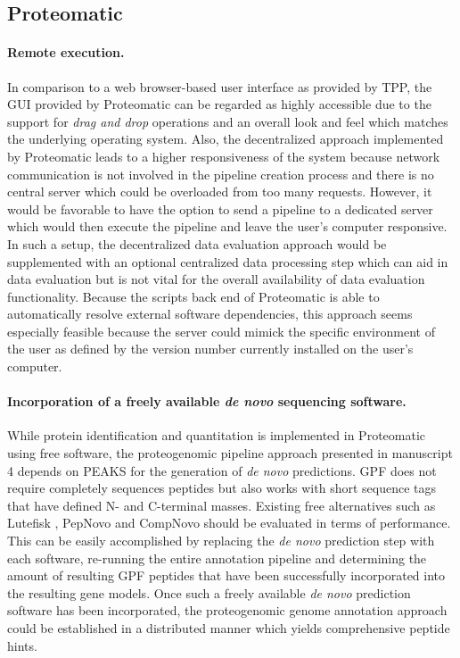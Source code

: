 \subsection{Proteomatic}

\paragraph{Remote execution.}

In comparison to a web browser-based user interface as provided by TPP, the 
GUI provided by Proteomatic can be regarded as highly accessible due to 
the support for {\em drag and drop} operations and an overall look and feel
which matches the underlying operating system.
Also, the decentralized approach implemented by Proteomatic leads to a
higher responsiveness of the system because network communication is not 
involved in the pipeline creation process and there is no central server which
could be overloaded from too many requests.
However, it would be favorable to have the option to send a pipeline to a 
dedicated server which would then execute the pipeline and leave the 
user's computer responsive.
In such a setup, the decentralized data evaluation approach would be 
supplemented with an optional centralized data processing step which can
aid in data evaluation but is not vital for the overall availability of
data evaluation functionality.
Because the scripts back end of Proteomatic is able to automatically resolve 
external software dependencies, this approach seems especially feasible because
the server could mimick the specific environment of the user as defined by
the version number currently installed on the user's computer.

\paragraph{Incorporation of a freely available {\em de novo} sequencing software.}

While protein identification and quantitation is implemented in Proteomatic
using free software, the proteogenomic pipeline approach presented in 
manuscript 4 depends on PEAKS for the generation of {\em de novo} predictions.
GPF does not require completely sequences peptides but also works with
short sequence tags that have defined N- and C-terminal masses.
Existing free alternatives such as Lutefisk \citep{Johnson2002}, PepNovo 
\citep{Frank2005} and CompNovo \citep{Bertsch2009} should be evaluated in
terms of performance.
This can be easily accomplished by replacing the {\em de novo} prediction
step with each software, re-running the entire annotation pipeline and 
determining the amount of resulting GPF peptides that have been successfully
incorporated into the resulting gene models.
Once such a freely available {\em de novo} prediction software has been
incorporated, the proteogenomic genome annotation approach could be 
established in a distributed manner which yields comprehensive peptide hints.

